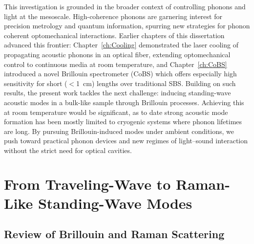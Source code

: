 This investigation is grounded in the broader context of controlling phonons and light at the mesoscale. High-coherence phonons are garnering interest for precision metrology and quantum information, \cite{balram2016coherent, schliesser2014cavity} spurring new strategies for phonon coherent optomechanical interactions. \cite{kippenberg2008cavity, aspelmeyer2014cavity} Earlier chapters of this dissertation advanced this frontier: Chapter~\ref{ch:Cooling} demonstrated the laser cooling of propagating acoustic phonons in an optical fiber, extending optomechanical control to continuous media at room temperature, \cite{johnson2023laser} and Chapter~\ref{ch:CoBS} introduced a novel Brillouin spectrometer (\acs{CoBS}) which offers especially high sensitivity for short (\(<\)\SI{1}{\centi\meter}) lengths over traditional \ac{SBS}. Building on such results, the present work tackles the next challenge: inducing standing-wave acoustic modes in a bulk-like sample through Brillouin processes. Achieving this at room temperature would be significant, as to date strong acoustic mode formation has been mostly limited to cryogenic systems where phonon lifetimes are long. \cite{otterstrom2018optomechanical, galliou2013extremely} By pursuing Brillouin-induced modes under ambient conditions, we push toward practical phonon devices and new regimes of light–sound interaction without the strict need for optical cavities. \cite{pant2011chip}


\section{From Traveling-Wave to Raman-Like Standing-Wave Modes}
\label{sec:Raman:FromTraveling-WavetoRaman-LikeStanding-WaveModes}

\subsection{Review of Brillouin and Raman Scattering}
\label{subsec:Raman:ReviewofBrillouinandRamanScattering}

